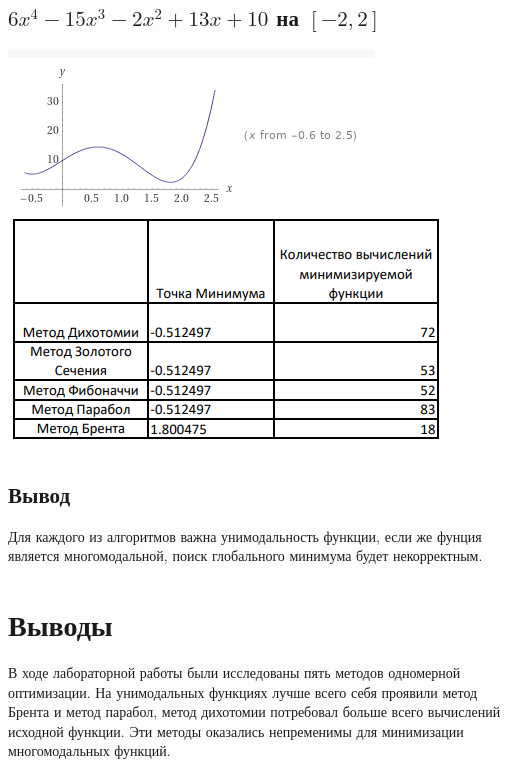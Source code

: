\documentclass[a4paper,12pt]{article}
\begin{document}
\subsection{$6x^4 - 15x^3 - 2x^2 + 13x+ 10$ на $[-2, 2]$}
\includegraphics[width=\linewidth]{poly1.PNG}
\includegraphics[width=\linewidth]{poly2.PNG}

\subsection{Вывод}
Для каждого из алгоритмов важна унимодальность функции, если же фунция является многомодальной, поиск глобального минимума будет некорректным.

\section{Выводы}
В ходе лабораторной работы были исследованы пять методов одномерной оптимизации. На унимодальных функциях лучше всего себя проявили метод Брента и метод парабол, метод дихотомии потребовал больше всего вычислений исходной функции. Эти методы оказались непременимы для минимизации многомодальных функций.
\end{document}
